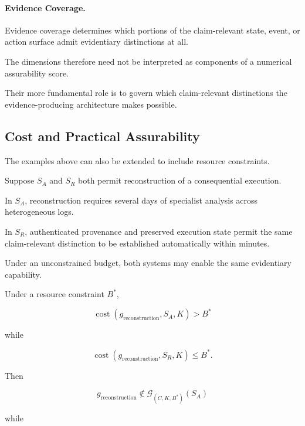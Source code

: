 \paragraph{Evidence Coverage.}
Evidence coverage determines which portions of the claim-relevant state,
event, or action surface admit evidentiary distinctions at all.

The dimensions therefore need not be interpreted as components of
a numerical assurability score.

Their more fundamental role is to govern which claim-relevant
distinctions the evidence-producing architecture makes possible.

\subsection{Cost and Practical Assurability}
\label{aa.subsec.case-cost}

The examples above can also be extended to include resource constraints.

Suppose \(S_A\) and \(S_R\) both permit reconstruction of a consequential
execution.

In \(S_A\), reconstruction requires several days of specialist analysis
across heterogeneous logs.

In \(S_R\), authenticated provenance and preserved execution state permit
the same claim-relevant distinction to be established automatically
within minutes.

Under an unconstrained budget, both systems may enable the same
evidentiary capability.

Under a resource constraint \(B^\ast\),

\begin{equation}
  \operatorname{cost}
  \left(
  g_{\mathrm{reconstruction}},
  S_A,
  K
  \right)
  >
  B^\ast
\end{equation}

while

\begin{equation}
  \operatorname{cost}
  \left(
  g_{\mathrm{reconstruction}},
  S_R,
  K
  \right)
  \le
  B^\ast.
\end{equation}

Then

\begin{equation}
  g_{\mathrm{reconstruction}}
  \notin
  \mathcal{G}_{(C,K,B^\ast)}(S_A)
\end{equation}

while

